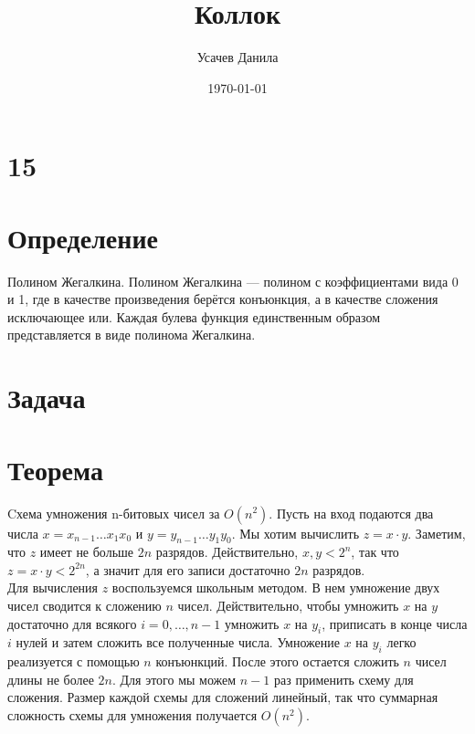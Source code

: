 \documentclass[12pt,a4paper]{scrartcl}
\title{Коллок}
\author{Усачев Данила}
\date{\today}
\begin{document}
\maketitle
\noindent
\section*{15}
\section*{Определение}
Полином Жегалкина.
Полином Жегалкина — полином с коэффициентами вида
0 и 1, где в качестве произведения берётся конъюнкция, а в качестве сложения
исключающее или. Каждая булева функция единственным образом представляется в виде полинома Жегалкина.
\section*{Задача}
\section*{Теорема}
Cхема умножения n-битовых чисел за $O(n^2)$.
Пусть на вход подаются два числа $x=x_{n-1}\ldots x_1x_0$ и
$y=y_{n-1}\ldots y_1y_0$. Мы хотим вычислить $z = x \cdot y$. Заметим, что
$z$ имеет не больше $2n$ разрядов. Действительно, $x, y < 2^n$, так что
$z = x \cdot y < 2^{2n}$, а значит для его записи достаточно $2n$ разрядов.\\
Для вычисления $z$ воспользуемся школьным методом. В нем умножение двух чисел
сводится к сложению $n$ чисел. Действительно, чтобы умножить $x$ на $y$ достаточно
для всякого $i = 0, \ldots , n - 1$ умножить $x$ на $y_i$, приписать в конце числа
$i$ нулей и затем сложить все полученные числа. Умножение $x$ на $y_i$ легко
реализуется с помощью $n$ конъюнкций. После этого остается сложить $n$ чисел
длины не более $2n$. Для этого мы можем $n-1$ раз применить схему для сложения.
Размер каждой схемы для сложений линейный, так что суммарная сложность схемы для
умножения получается $O(n^2)$.
\end{document}
